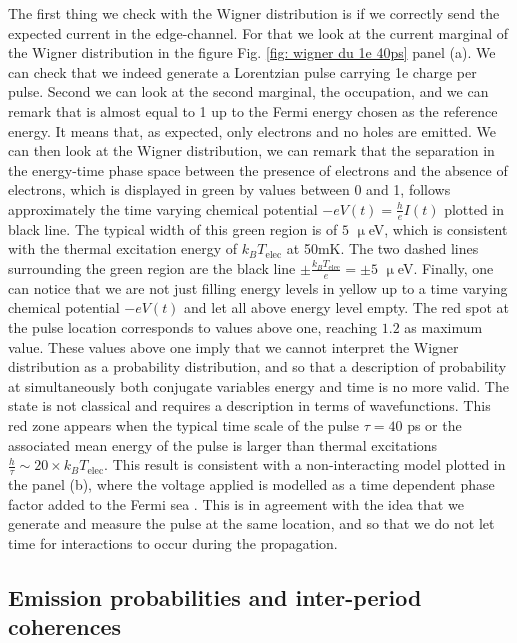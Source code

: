 The first thing we check with the Wigner distribution is if we correctly send the expected current in the edge-channel.
For that we look at the current marginal of the Wigner distribution in the figure Fig. \ref{fig: wigner du 1e 40ps} panel (a).%
We can check that we indeed generate a Lorentzian pulse carrying 1e charge per pulse.
Second we can look at the second marginal, the occupation, and we can remark that is almost equal to 1 up to the Fermi energy chosen as the reference energy.
It means that, as expected, only electrons and no holes are emitted.
We can then look at the Wigner distribution, we can remark that the separation in the energy-time phase space between the presence of electrons and the absence of electrons, which is displayed in green by values between 0 and 1, follows approximately the time varying chemical potential $-eV(t) = \frac{h}{e}I(t)$ plotted in black line.
The typical width of this green region is of $5$ $\upmu$eV, which is consistent with the thermal excitation energy of $k_{B}T_{\mathrm{elec}}$ at 50mK.
The two dashed lines surrounding the green region are the black line $\pm \frac{k_{B}T_{\mathrm{elec}}}{e} = \pm5$ $\upmu$eV. 
Finally, one can notice that we are not just filling energy levels in yellow up to a time varying chemical potential $-eV(t)$ and let all above energy level empty.
The red spot at the pulse location corresponds to values above one, reaching $1.2$ as maximum value.
These values above one imply that we cannot interpret the Wigner distribution as a probability distribution, and so that a description of probability at simultaneously both conjugate variables energy and time is no more valid.
The state is not classical and requires a description in terms of wavefunctions.
This red zone appears when the typical time scale of the pulse $\tau = 40$ ps or the associated mean energy of the pulse is larger than thermal excitations $\frac{h}{\tau} \sim 20\times k_{B}T_{\mathrm{elec}}$.
This result is consistent with a non-interacting model plotted in the panel (b), where the voltage applied is modelled as a time dependent phase factor added to the Fermi sea \cite{grenier2011single}.
This is in agreement with the idea that we generate and measure the pulse at the same location, and so that we do not let time for interactions to occur during the propagation.



\subsection{Emission probabilities and inter-period coherences}

